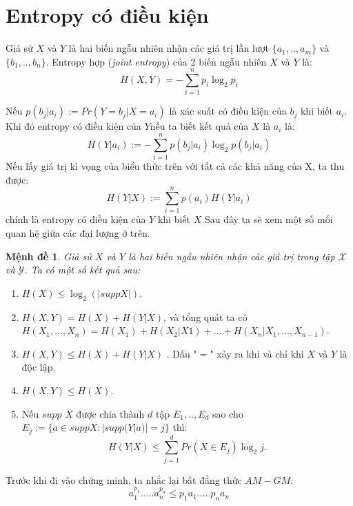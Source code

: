 \documentclass[a4paper, 12pt]{report}
\newtheorem{Proposition}{Mệnh đề } %
\begin{document}
\section{Entropy có điều kiện}
Giả sử $X$ và $Y$ là hai biến ngẫu nhiên nhận các giá trị lần lượt $\{a_1,..,a_m\}$ và $\{b_1,..,b_n\}$. Entropy hợp (\textit{joint entropy}) của 2 biến ngẫu nhiên $X$ và $Y$ là:
\begin{equation*}
H(X,Y) = -\displaystyle \sum_{i=1}^{n}p_i\log_{2}p_i
\end{equation*}

Nếu \(p(b_{j}|a_{i}):= Pr(Y=b_{j}|X=a_{i})\) là xác suất có điều kiện của $b_j$ khi biết $a_i$. Khi đó entropy có điều kiện của \(Y\)nếu ta biết kết quả của \(X\) là \(a_{i}\) là:
\begin{equation*}
    H(Y|a_{i}) := -\sum_{i=1}^{n}p(b_{j}|a_{i})\log_{2}p(b_{j}|a_{i})
\end{equation*}
Nếu lấy giá trị kì vọng của biểu thức trên với tất cả các khả năng của X, ta thu được:
\begin{equation*}
    H(Y|X) := \sum_{i=1}^{n}p(a_{i})H(Y|a_{i})
\end{equation*}
chính là entropy có điều kiện của $Y$ khi biết $X$
Sau đây ta sẽ xem một số mối quan hệ giữa các đại lượng ở trên.
\begin{Proposition}
Giả sử $X$ và $Y$ là hai biến ngẫu nhiên nhận các giá trị trong tập $\mathscr{X}$ và $\mathscr{Y}$. Ta có một số kết quả sau:
\end{Proposition}
\begin{enumerate}[label=\textbf{(\Alph*)}]
\item \(H(X) \leq \log_{2}(|supp X|)\).
\item \(H(X,Y) = H(X) + H(Y|X)\), và tổng quát ta có \(H(X_{1},...,X_{n}) = H(X_{1}) + H(X_{2}|X{1}) + ... + H(X_{n}|X_{1},...,X_{n-1})\).
\item \(H(X,Y) \leq H(X) + H(Y|X)\) . Dấu "$=$" xảy ra khi và chỉ khi $X$ và $Y$ là độc lập.
\item \(H(X,Y) \leq H(X) \).
\item Nếu \(supp\) \(X\) được chia thành $d$ tập \(E_{1},..,E_{d}\) sao cho \(E_{j}:= \{a \in suppX : |supp(Y|a)| = j \} \) thì:
\begin{equation*}
    H(Y|X) \leq \sum_{j=1}^{d}Pr(X \in E_{j})\log_{2}j.
\end{equation*}
\end{enumerate}
Trước khi đi vào chứng minh, ta nhắc lại bất đẳng thức $AM-GM$: 
\begin{equation*}
	a_{1}^{p_{1}}. ... .a_{n}^{p_{n}} \leq p_{1}a_{1}. ... .p_{n}a_{n}
\end{equation*}
\end{document}
